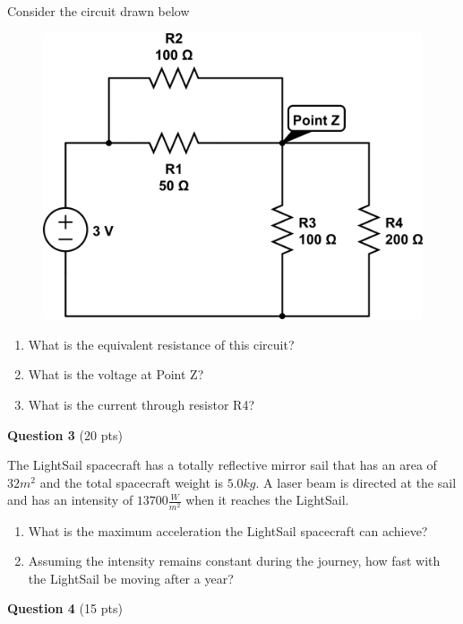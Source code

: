\documentclass[14pt]{report}
\begin{document}
Consider the circuit drawn below

\begin{figure}[H]
\begin{center}
\includegraphics[scale=0.38]{final_2.png}
\end{center}
\end{figure}

\begin{enumerate}[label=\Alph*]
\item What is the equivalent resistance of this circuit?
\item What is the voltage at Point Z?
\item What is the current through resistor R4?
\end{enumerate}

\newpage

\textbf{Question 3} (20 pts)

The LightSail spacecraft has a totally reflective mirror sail that has an area of $32m^2$ and the total spacecraft weight is $5.0kg$. A laser beam is directed at the sail and has an intensity of $13700 \frac{W}{m^2}$ when it reaches the LightSail.

\begin{enumerate}[label=\Alph*]
\item What is the maximum acceleration the LightSail spacecraft can achieve?
\item Assuming the intensity remains constant during the journey, how fast with the LightSail be moving after a year?
\end{enumerate}

\textbf{Question 4} (15 pts)
\end{document}
